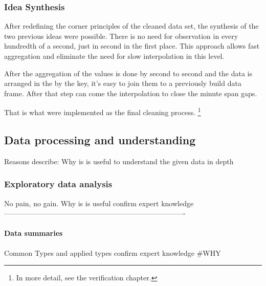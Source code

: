 		\subsubsection{Idea Synthesis}
		After redefining the corner principles of the cleaned data set, the synthesis of the two previous ideas were possible.
		There is no need for observation in every hundredth of a second, just in second in the first place. This approach allows fast aggregation and eliminate the need for slow interpolation in this level.

		After the aggregation of the values is done by second to second and the data is arranged in the by the key, it's easy to join them to a previously build data frame. After that step can come the interpolation to close the minute span gaps.

		That is what were implemented as the final cleaning process. \footnote{In more detail, see the verification chapter.}
\subsection{Data processing and understanding}
		Reasons describe: Why is is useful to understand the given data in depth
	\subsubsection{Exploratory data analysis}
		No pain, no gain. Why is is useful
		confirm expert knowledge
%
----------------------------------------------------------------------------
		\paragraph{Data summaries}
		Common Types and applied types
		confirm expert knowledge
		\#WHY
